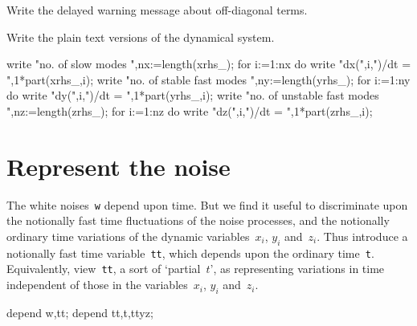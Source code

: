 \documentclass[11pt,a5paper]{article}
\begin{document}
Write the delayed warning message about off-diagonal terms.

Write the plain text versions of the dynamical system.
\begin{reduce}
write "no. of slow modes ",nx:=length(xrhs_);
for i:=1:nx do write "dx(",i,")/dt = ",1*part(xrhs_,i);
write "no. of stable fast modes ",ny:=length(yrhs_);
for i:=1:ny do write "dy(",i,")/dt = ",1*part(yrhs_,i);
write "no. of unstable fast modes ",nz:=length(zrhs_);
for i:=1:nz do write "dz(",i,")/dt = ",1*part(zrhs_,i);
\end{reduce}



\section{Represent the noise}

The white noises~\verb|w| depend upon time.
But we find it useful to discriminate upon the notionally fast time fluctuations of the noise processes, and the notionally ordinary time variations of the dynamic variables~$x_i$, $y_i$ and~$z_i$.
Thus introduce a notionally fast time variable~\verb|tt|, which depends upon the ordinary time~\verb|t|.
Equivalently, view~\verb|tt|, a sort of `partial~$t$', as representing variations in time independent of those in the variables~$x_i$, $y_i$ and~$z_i$.
\begin{reduce}
depend w,tt;
depend tt,t,ttyz;
\end{reduce}
\end{document}

